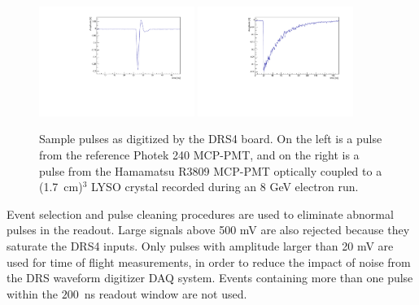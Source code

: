 \documentclass[12pt]{article}
\begin{document}
{\begin{figure}[h] \centering
\includegraphics[width=0.45\textwidth]{figs/RefPulse} 
\includegraphics[width=0.45\textwidth]{figs/run064_event506} 
\caption{Sample pulses as digitized by the DRS4 board. 
On the left is a  pulse from the reference Photek 240 MCP-PMT, 
and on the right is a pulse from the Hamamatsu R3809 MCP-PMT
optically coupled to a (1.7~cm)$^{3}$ LYSO crystal 
recorded during an 8 GeV electron run.} 
\label{fig:PulseShapes}
\end{figure}

Event selection and pulse cleaning procedures are used to eliminate abnormal
pulses in the readout. Large signals above 500 mV are also rejected because they
saturate the DRS4 inputs. Only pulses with amplitude larger than 20 mV are used
for time of flight measurements, in order to reduce the impact of noise from the
DRS waveform digitizer DAQ system. Events containing more than one pulse within
the $200$~ns readout window are not used. 

}
\end{document}
